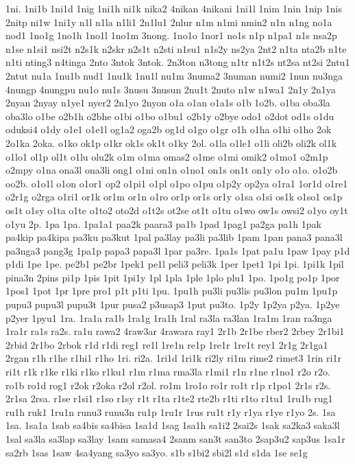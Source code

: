 {1ni.
1ni1b
1ni1d
1nig
1ni1h
ni1k
nika2
4nikan
4nikani
1ni1l
1nim
1nin
1nip
1nis
2nitp
ni1w
1ni1y
n1l
n1la
n1li1
2n1lu1
2nlur
n1m
n1mi
nmin2
n1n
n1ng
no1a
nod1
1no1g
1no1h
1no1l
1no1m
3nong.
1no1o
1nor1
no1s
n1p
n1pa1
n1s
nsa2p
n1se
n1si1
nsi2t
n2s1k
n2skr
n2s1t
n2sti
n1su1
n1s2y
ns2ya
2nt2
n1ta
nta2b
n1te
n1ti
nting3
n4tinga
2nto
3ntok
3ntok.
2n3ton
n3tong
n1tr
n1t2s
nt2sa
nt2si
2ntu1
2ntut
nu1a
1nu1b
nud1
1nu1k
1nu1l
nu1m
3numa2
3numan
numi2
1nun
nu3nga
4nungp
4nungpu
nu1o
nu1s
3nusu
3nusun
2nu1t
2nuto
n1w
n1wa1
2n1y
2n1ya
2nyan
2nyay
n1ye1
nyer2
2n1yo
2nyon
o1a
o1an
o1a1s
o1b
1o2b.
o1ba
oba3la
oba3lo
o1be
o2b1h
o2bhe
o1bi
o1bo
o1bu1
o2b1y
o2bye
odo1
o2dot
od1s
o1du
oduksi4
o1dy
o1e1
o1e1l
og1a2
oga2b
og1d
o1go
o1gr
o1h
o1ha
o1hi
o1ho
2ok
2o1ka
2oka.
o1ko
ok1p
o1kr
ok1s
ok1t
o1ky
2ol.
o1la
o1le1
o1li
oli2b
oli2k
ol1k
o1lo1
ol1p
ol1t
o1lu
olu2k
o1m
o1ma
omas2
o1me
o1mi
omik2
o1mo1
o2m1p
o2mpy
o1na
ona3l
ona3li
ong1
o1ni
on1n
o1no1
on1s
on1t
on1y
o1o
o1o.
o1o2b
oo2b.
o1o1l
o1on
o1or1
op2
o1pi1
o1pl
o1po
o1pu
o1p2y
op2ya
o1ra1
1or1d
o1re1
o2r1g
o2rga
o1ri1
or1k
or1m
or1n
o1ro
or1p
or1s
or1y
o1sa
o1si
os1k
o1so1
os1p
os1t
o1sy
o1ta
o1te
o1to2
oto2d
o1t2s
ot2se
ot1t
o1tu
o1wo
ow1s
owsi2
o1yo
oy1t
o1yu
2p.
1pa
1pa.
1pa1a1
paa2k
paara3
pa1b
1pad
1pag1
pa2ga
pa1h
1pak
pa4kip
pa4kipa
pa3ku
pa3kut
1pal
pa3lay
pa3li
pa3lib
1pam
1pan
pana3
pana3l
pa3nga3
pang3g
1pa1p
papa3
papa3l
1par
pa3re.
1pa1s
1pat
pa1u
1paw
1pay
p1d
p1di
1pe
1pe.
pe2b1
pe2br
1pek1
pe1l
peli3
peli3k
1per
1pet1
1pi
1pi.
1pi1k
1pil
pina3n
2pins
pi1p
1pis
1pit
1pi1y
1pl
1pla
1ple
1plo
plu1
1po.
1po1g
po1p
1por
1pos1
1pot
1pr
1pre
pro1
p1t
p1ti
1pu.
1pu1h
pu3li
pu3lis
pu3lon
pu1m
1pu1p
pupu3
pupu3l
pupu3t
1pur
pusa2
p3usap3
1put
pu3to.
1p2y
1p2ya
p2ya.
1p2ye
p2yer
1pyu1
1ra.
1ra1a
ra1b
1ra1g
1ra1h
1ral
ra3la
ra3lan
1ra1m
1ran
ra3nga
1ra1r
ra1s
ra2s.
ra1u
rawa2
4raw3ar
4rawara
ray1
2r1b
2r1be
rber2
2rbey
2r1bi1
2rbid
2r1bo
2rbok
r1d
r1di
reg1
re1l
1re1n
re1p
1re1r
1re1t
rey1
2r1g
2r1ga1
2rgan
r1h
r1he
r1hi1
r1ho
1ri.
ri2a.
1ri1d
1ri1k
ri2ly
ri1m
rime2
rimet3
1rin
ri1r
ri1t
r1k
r1ke
r1ki
r1ko
r1ku1
r1m
r1ma
rma3la
r1mi1
r1n
r1ne
r1no1
r2o
r2o.
ro1b
ro1d
rog1
r2ok
r2oka
r2ol
r2ol.
ro1m
1ro1o
ro1r
ro1t
r1p
r1po1
2r1s
r2s.
2r1sa
2rsa.
r1se
r1si1
r1so
r1sy
r1t
r1ta
r1te2
rte2b
r1ti
r1to
r1tu1
1ru1b
rug1
ru1h
ruk1
1ru1n
runu3
runu3n
ru1p
1ru1r
1rus
ru1t
r1y
r1ya
r1ye
r1yo
2s.
1sa
1sa.
1sa1a
1sab
sa4bis
sa4bisa
1sa1d
1sag
1sa1h
sa1i2
2sai2s
1sak
sa2ka3
saka3l
1sal
sa3la
sa3lap
sa3lay
1sam
samasa4
2sanm
san3t
san3to
2sap3u2
sap3us
1sa1r
sa2rb
1sas
1saw
4sa4yang
sa3yo
sa3yo.
s1b
s1bi2
sbi2l
s1d
s1da
1se
se1g
}
